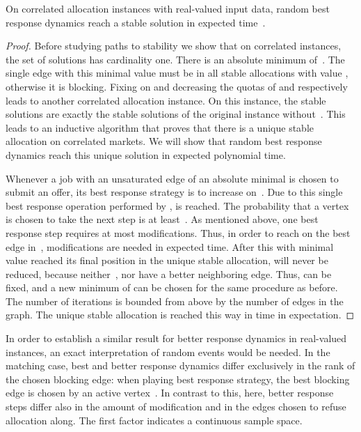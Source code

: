 \documentclass{llncs}
\begin{document}
\begin{theorem}
\label{th:cor}
On correlated allocation instances with real-valued input data, random best response dynamics reach a stable solution in expected time~.
\end{theorem}

\begin{proof}
	Before studying paths to stability we show that on correlated instances, the set of solutions has cardinality one. There is an absolute minimum of~. The single edge  with this minimal  value must be in all stable allocations with value , otherwise it is blocking. Fixing  on  and decreasing the quotas of  and  respectively leads to another correlated allocation instance. On this instance, the stable solutions are exactly the stable solutions of the original instance without~. This leads to an inductive algorithm that proves that there is a unique stable allocation on correlated markets. We will show that random best response dynamics reach this unique solution in expected polynomial time.

	Whenever a job  with an unsaturated edge  of an absolute minimal  is chosen to submit an offer, its best response strategy is to increase  on~. Due to this single best response operation performed by ,  is reached. The probability that a vertex  is chosen to take the next step is at least~. As mentioned above, one best response step requires at most  modifications. Thus, in order to reach  on the best edge in~,  modifications are needed in expected time. After this  with minimal  value reached its final position in the unique stable allocation,  will never be reduced, because neither~, nor  have a better neighboring edge. Thus,  can be fixed, and a new minimum of  can be chosen for the same procedure as before. The number of iterations is bounded from above by the number of edges in the graph. The unique stable allocation is reached this way in  time in expectation.\end{proof}

In order to establish a similar result for better response dynamics in real-valued instances, an exact interpretation of random events would be needed. In the matching case, best and better response dynamics differ exclusively in the rank of the chosen blocking edge: when playing best response strategy, the best blocking edge is chosen by an active vertex~. In contrast to this, here, better response steps differ also in the amount of modification and in the edges chosen to refuse allocation along. The first factor indicates a continuous sample space.
\end{document}
